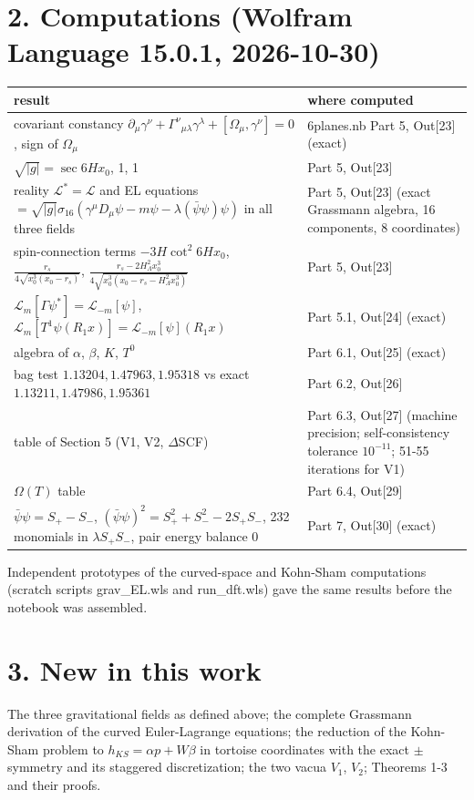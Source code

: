 \documentclass[10pt]{article}
\begin{document}
\section*{2. Computations (Wolfram Language 15.0.1, 2026-10-30)}

{\small\begin{longtable}{>{\raggedright\arraybackslash}p{}>{\raggedright\arraybackslash}p{}}\toprule
result & where computed \\\midrule\endhead
\bottomrule\endfoot
covariant constancy $\partial_\mu\gamma^\nu + \Gamma^\nu{}_{\mu\lambda}\gamma^\lambda + [\Omega_\mu,\gamma^\nu] = 0$, sign of $\Omega_\mu$ & 6planes.nb Part 5, Out[23] (exact) \\
$\sqrt{\lvert g\rvert} = \sec 6Hx_0$, 1, 1 & Part 5, Out[23] \\
reality $\mathcal L^* = \mathcal L$ and EL equations $=\sqrt{\lvert g\rvert}\sigma_{16}(\gamma^\mu D_\mu\psi - m\psi - \lambda(\bar\psi\psi)\psi)$ in all three fields & Part 5, Out[23] (exact Grassmann algebra, 16 components, 8 coordinates) \\
spin-connection terms $-3H\cot^2 6Hx_0$, $\frac{r_s}{4\sqrt{x_0^3(x_0-r_s)}}$, $\frac{r_s - 2H_\Lambda^2x_0^3}{4\sqrt{x_0^3(x_0-r_s-H_\Lambda^2x_0^3)}}$ & Part 5, Out[23] \\
$\mathcal L_{m}[\Gamma\psi^*] = \mathcal L_{-m}[\psi]$, $\mathcal L_m[T^1\psi(R_1x)] = \mathcal L_{-m}[\psi](R_1x)$ & Part 5.1, Out[24] (exact) \\
algebra of $\alpha$, $\beta$, $K$, $T^0$ & Part 6.1, Out[25] (exact) \\
bag test $1.13204, 1.47963, 1.95318$ vs exact $1.13211, 1.47986, 1.95361$ & Part 6.2, Out[26] \\
table of Section 5 (V1, V2, $\Delta$SCF) & Part 6.3, Out[27] (machine precision; self-consistency tolerance $10^{-11}$; 51-55 iterations for V1) \\
$\Omega(T)$ table & Part 6.4, Out[29] \\
$\bar\psi\psi = S_+ - S_-$, $(\bar\psi\psi)^2 = S_+^2+S_-^2-2S_+S_-$, 232 monomials in $\lambda S_+S_-$, pair energy balance 0 & Part 7, Out[30] (exact) \\
\end{longtable}}

Independent prototypes of the curved-space and Kohn-Sham computations (scratch scripts grav\_EL.wls and run\_dft.wls) gave the same results before the notebook was assembled.


\section*{3. New in this work}

The three gravitational fields as defined above; the complete Grassmann derivation of the curved Euler-Lagrange equations; the reduction of the Kohn-Sham problem to $h_{KS} = \alpha p + W\beta$ in tortoise coordinates with the exact $\pm$ symmetry and its staggered discretization; the two vacua $V_1$, $V_2$; Theorems 1-3 and their proofs.
\end{document}
